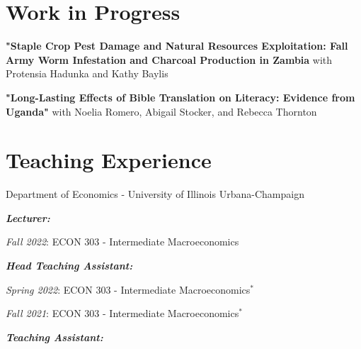 \documentclass[letterpaper,11pt]{article}
\begin{document}
\section{Work in Progress}

\begin{adjustwidth}{3mm}{0mm}
\textbf{"Staple Crop Pest Damage and Natural Resources Exploitation: Fall Army Worm Infestation and Charcoal Production in Zambia}  with Protensia Hadunka and Kathy Baylis
\end{adjustwidth}

\begin{adjustwidth}{3mm}{0mm}
\textbf{"Long-Lasting Effects of Bible Translation on Literacy: Evidence from Uganda"} with Noelia Romero, Abigail Stocker, and Rebecca Thornton
\end{adjustwidth}


\section{Teaching Experience}
\begin{adjustwidth}{3mm}{0mm}
Department of Economics - University of Illinois Urbana-Champaign
\end{adjustwidth}

\begin{adjustwidth}{6mm}{0mm}
  \textbf{\textit{Lecturer:}}
\end{adjustwidth}

\begin{adjustwidth}{9mm}{0mm}
  \textit{Fall 2022}: ECON 303 - Intermediate Macroeconomics
\end{adjustwidth}

\begin{adjustwidth}{6mm}{0mm}
  \textbf{\textit{Head Teaching Assistant:}}
\end{adjustwidth}

\begin{adjustwidth}{9mm}{0mm}
  \textit{Spring 2022}: ECON 303 - Intermediate Macroeconomics$^*$
\end{adjustwidth}

\begin{adjustwidth}{9mm}{0mm}
  \textit{Fall 2021}: ECON 303 - Intermediate Macroeconomics$^*$
\end{adjustwidth}

\begin{adjustwidth}{6mm}{0mm}
  \textbf{\textit{Teaching Assistant:}}
\end{adjustwidth}
\end{document}
